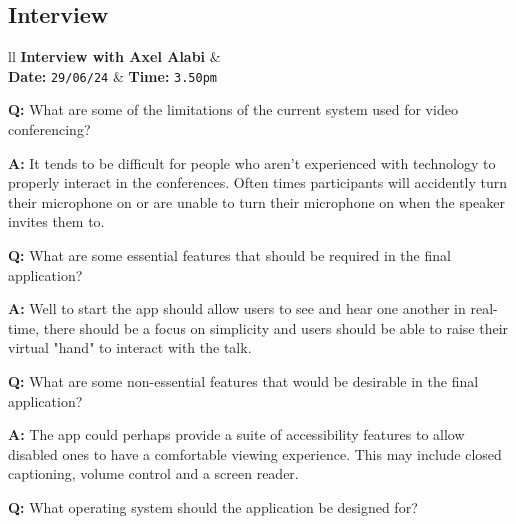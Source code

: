 \subsection{Interview}
\label{sec:interview}

\begin{tcolorbox}[
  boxrule=0pt, frame empty, colback=lightestgray, arc=0pt,
  breakable, colframe=white
]
  \begin{tblr}{ll}
    \textbf{Interview with Axel Alabi} & {}\\
    \textbf{Date: } \texttt{29/06/24} &
    {\hspace{-1.5cm} \textbf{Time: } \texttt{3.50pm}}
  \end{tblr}

  \vspace{0.2cm}

  \textbf{Q:} What are some of the limitations of the current
  system used for video conferencing? \vspace{0.05cm}

  \textbf{A:} It tends to be difficult for people who aren't 
  experienced with technology to properly interact in the 
  conferences. Often times participants will accidently turn 
  their microphone on or are unable to turn their microphone
  on when the speaker invites them to. \vspace{0.25cm}

  \textbf{Q:} What are some essential features that should be
  required in the final application? \vspace{0.05cm}

  \textbf{A:} Well to start the app should allow users to see 
  and hear one another in real-time, there should be a focus on
  simplicity and users should be able to raise their virtual 
  "hand" to interact with the talk. \vspace{0.25cm}

  \textbf{Q:} What are some non-essential features that would
  be desirable in the final application? \vspace{0.05cm}

  \textbf{A:} The app could perhaps provide a suite of 
  accessibility features to allow disabled ones to have a 
  comfortable viewing experience. This may include closed
  captioning, volume control and a screen reader.
  \vspace{0.25cm}

  \textbf{Q:} What operating system should the application be 
  designed for? \vspace{0.05cm}


\end{tcolorbox}
